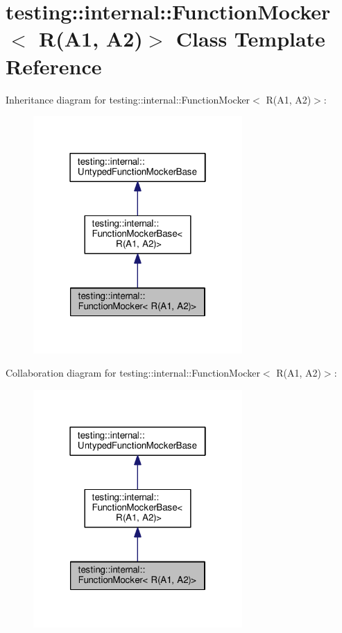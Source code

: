 \hypertarget{classtesting_1_1internal_1_1FunctionMocker_3_01R_07A1_00_01A2_08_4}{}\section{testing\+:\+:internal\+:\+:Function\+Mocker$<$ R(A1, A2)$>$ Class Template Reference}
\label{classtesting_1_1internal_1_1FunctionMocker_3_01R_07A1_00_01A2_08_4}


Inheritance diagram for testing\+:\+:internal\+:\+:Function\+Mocker$<$ R(A1, A2)$>$\+:\nopagebreak
\begin{figure}[H]
\begin{center}
\leavevmode
\includegraphics[width=226pt]{classtesting_1_1internal_1_1FunctionMocker_3_01R_07A1_00_01A2_08_4__inherit__graph}
\end{center}
\end{figure}


Collaboration diagram for testing\+:\+:internal\+:\+:Function\+Mocker$<$ R(A1, A2)$>$\+:\nopagebreak
\begin{figure}[H]
\begin{center}
\leavevmode
\includegraphics[width=226pt]{classtesting_1_1internal_1_1FunctionMocker_3_01R_07A1_00_01A2_08_4__coll__graph}
\end{center}
\end{figure}
